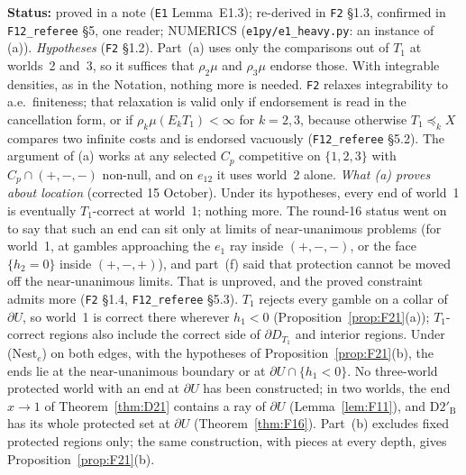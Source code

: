 \documentclass[11pt]{article}
\theoremstyle{definition}
\theoremstyle{remark}
\newcommand{\src}[1]{\texttt{#1}}
\newcommand{\status}[1]{\par\smallskip\noindent\textbf{Status:} #1\par\smallskip}
\begin{document}
\status{proved in a note (\src{E1} Lemma~E1.3); re-derived in \src{F2} \S1.3, confirmed in \src{F12\_referee} \S5, one reader; NUMERICS (\src{e1py/e1\_heavy.py}: an instance of (a)). \emph{Hypotheses} (\src{F2} \S1.2). Part~(a) uses only the comparisons out of $T_1$ at worlds~2 and~3, so it suffices that $\rho_2\mu$ and $\rho_3\mu$ endorse those. With integrable densities, as in the Notation, nothing more is needed. \src{F2} relaxes integrability to a.e.\ finiteness; that relaxation is valid only if endorsement is read in the cancellation form, or if $\rho_k\mu(E_kT_1)<\infty$ for $k=2,3$, because otherwise $T_1\preceq_kX$ compares two infinite costs and is endorsed vacuously (\src{F12\_referee} \S5.2). The argument of (a) works at any selected $C_p$ competitive on $\{1,2,3\}$ with $C_p\cap(+,-,-)$ non-null, and on $e_{12}$ it uses world~2 alone. \emph{What (a) proves about location} (corrected 15 October). Under its hypotheses, every end of world~1 is eventually $T_1$-correct at world~1; nothing more. The round-16 status went on to say that such an end can sit only at limits of near-unanimous problems (for world~1, at gambles approaching the $e_1$ ray inside $(+,-,-)$, or the face $\{h_2=0\}$ inside $(+,-,+)$), and part~(f) said that protection cannot be moved off the near-unanimous limits. That is unproved, and the proved constraint admits more (\src{F2} \S1.4, \src{F12\_referee} \S5.3). $T_1$ rejects every gamble on a collar of $\partial U$, so world~1 is correct there wherever $h_1<0$ (Proposition~\ref{prop:F21}(a)); $T_1$-correct regions also include the correct side of $\partial D_{T_1}$ and interior regions. Under (Nest$_e$) on both edges, with the hypotheses of Proposition~\ref{prop:F21}(b), the ends lie at the near-unanimous boundary or at $\partial U\cap\{h_1<0\}$. No three-world protected world with an end at $\partial U$ has been constructed; in two worlds, the end $x\to1$ of Theorem~\ref{thm:D21} contains a ray of $\partial U$ (Lemma~\ref{lem:F11}), and $\mathrm{D2}'_{\mathrm B}$ has its whole protected set at $\partial U$ (Theorem~\ref{thm:F16}). Part~(b) excludes fixed protected regions only; the same construction, with pieces at every depth, gives Proposition~\ref{prop:F21}(b).}
\end{document}
